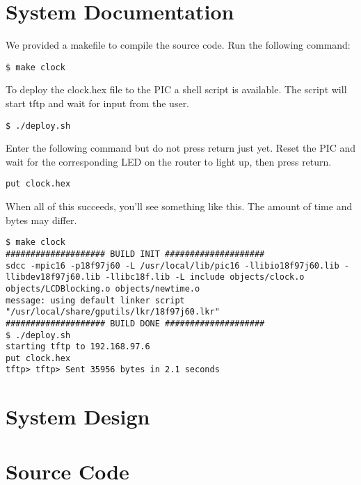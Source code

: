 \documentclass[11pt]{article}
\begin{document}
\section{System Documentation}
We provided a makefile to compile the source code. Run the following command:
\begin{lstlisting}
$ make clock 
\end{lstlisting}
To deploy the clock.hex file to the PIC a shell script is available. The script will start tftp and wait for input from the user. 
\begin{lstlisting}
$ ./deploy.sh 
\end{lstlisting}
Enter the following command but do not press return just yet. Reset the PIC and wait for the corresponding LED on the router to light up, then press return.
\begin{lstlisting}
put clock.hex
\end{lstlisting}
When all of this succeeds, you'll see something like this. The amount of time and bytes may differ.
\begin{lstlisting}
$ make clock 
#################### BUILD INIT ####################
sdcc -mpic16 -p18f97j60 -L /usr/local/lib/pic16 -llibio18f97j60.lib -llibdev18f97j60.lib -llibc18f.lib -L include objects/clock.o objects/LCDBlocking.o objects/newtime.o
message: using default linker script "/usr/local/share/gputils/lkr/18f97j60.lkr"
#################### BUILD DONE ####################
$ ./deploy.sh 
starting tftp to 192.168.97.6
put clock.hex
tftp> tftp> Sent 35956 bytes in 2.1 seconds
\end{lstlisting}

\section{System Design}


\appendix

\section{Source Code}






\end{document}
